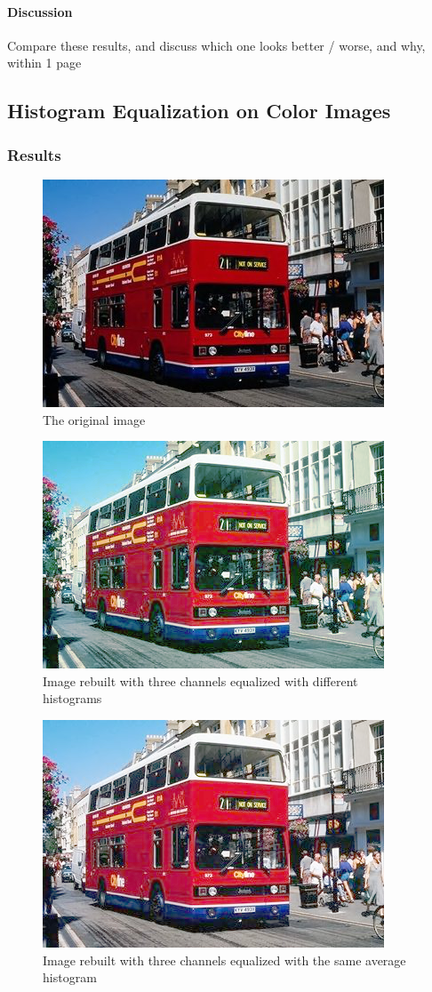 \documentclass{article}
\begin{document}
\paragraph{Discussion}
Compare these results, and discuss which one looks better / worse, and why, within 1 page

\subsection{Histogram Equalization on Color Images}

\subsubsection{Results}

\begin{figure}[H]
	\centering
	\includegraphics[width=288pt]{../img/02.png}
	\caption{The original image}
\end{figure}

\begin{figure}[H]
	\centering
	\includegraphics[width=288pt]{../result/hist/hist-seperate.png}
	\caption{Image rebuilt with three channels equalized with different histograms}
\end{figure}

\begin{figure}[h]
	\centering
	\includegraphics[width=288pt]{../result/hist/hist-together.png}
	\caption{Image rebuilt with three channels equalized with the same average histogram}
\end{figure}
\end{document}

